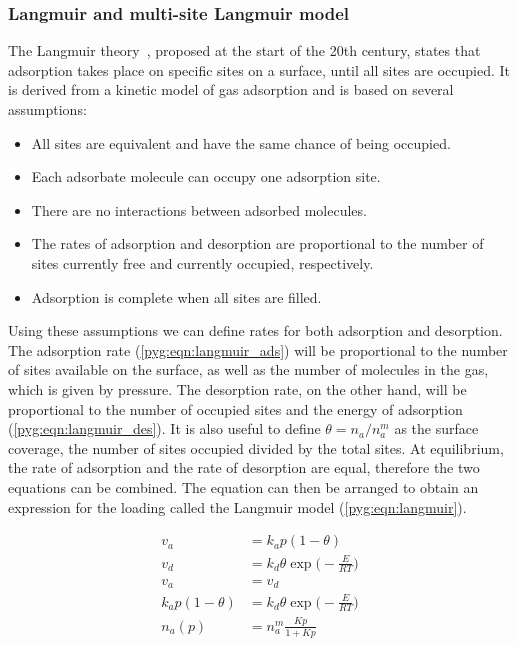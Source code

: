 \subsubsection{Langmuir and multi-site Langmuir
	model}\label{pyg:models:langmuir}

The Langmuir theory~\cite{langmuirAdsorptionGasesPlane1918},
proposed at the start of the 20th century, states that
adsorption takes place on specific sites on a surface, until
all sites are occupied.
It is derived from a kinetic model of gas adsorption and
is based on several assumptions:

\begin{itemize}

	\item All sites are equivalent and have the same chance of
	      being occupied.
	\item Each adsorbate molecule can occupy one adsorption site.
	\item There are no interactions between adsorbed molecules.
	\item The rates of adsorption and desorption are proportional
	      to the number
	      of sites currently free and currently occupied,
	      respectively.
	\item Adsorption is complete when all sites are filled.

\end{itemize}

Using these assumptions we can define rates for both adsorption and
desorption. The adsorption rate (\autoref{pyg:eqn:langmuir_ads})
will be proportional to the number of sites available on the surface,
as well as the number of molecules in the gas, which is given by
pressure.
The desorption rate, on the other hand, will be proportional to the
number of occupied sites and the energy of adsorption
(\autoref{pyg:eqn:langmuir_des}).
It is also useful to define \(\theta = n_a/n_a^m\) as the surface
coverage,
the number of sites occupied divided by the total sites. At
equilibrium,
the rate of adsorption and the rate of
desorption are equal, therefore the two equations can be combined.
The equation can then be arranged to obtain an expression for the
loading called the Langmuir model (\autoref{pyg:eqn:langmuir}).

\begin{align}
	v_a                & = k_a p (1 - \theta) \label{pyg:eqn:langmuir_ads} \\
	v_d                & = k_d \theta \exp{\Big(-\frac{E}{RT}\Big)}
	\label{pyg:eqn:langmuir_des}                                           \\
	v_a                & = v_d                                             \\
	k_a p (1 - \theta) & = k_d \theta \exp{\Big(-\frac{E}{RT}\Big)}        \\
	n_a(p)             & = n_a^m \frac{Kp}{1+Kp} \label{pyg:eqn:langmuir}
\end{align}

